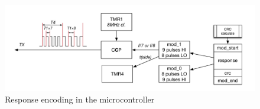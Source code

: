 \begin{figure}[h!]
    \centering
    \includegraphics[scale=0.5]{res/TX.pdf}
    \caption{Response encoding in the microcontroller}
    \label{fig:tx}
\end{figure}


%
